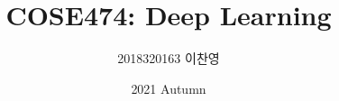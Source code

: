 

\title{COSE474: Deep Learning}
\author{2018320163 이찬영}
\date{2021 Autumn}


    \maketitle
    \tableofcontents

